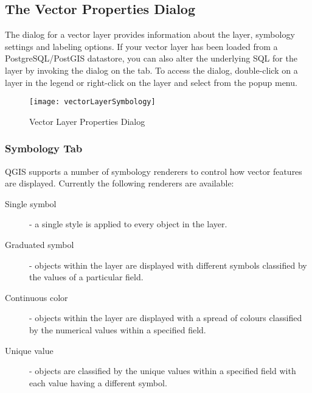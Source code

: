 \subsection{The Vector Properties Dialog}\label{sec:vectorprops}

The  dialog for a vector layer provides information
about the layer, symbology settings and labeling options. If your vector
layer has been loaded from a PostgreSQL/PostGIS datastore, you can also alter
the underlying SQL for the layer by invoking the 
dialog on the  tab. 
To access the  dialog, double-click on a layer in
the legend or right-click on the layer and select 
from the popup menu.

\begin{figure}[H]
   \begin{center}
   \caption{Vector Layer Properties Dialog \nixcaption}\label{fig:vector_symbology}\smallskip
   \texttt{[image: vectorLayerSymbology]} 
\end{center}  
\end{figure}

\subsubsection{Symbology Tab}\label{sec:symbology}

QGIS supports a number of symbology renderers to control how
vector features are displayed. Currently the following renderers
are available:

\begin{description} 
    \item[Single symbol] - a single style is applied to every
    object in the layer.
    \item[Graduated symbol] - objects within the layer are
    displayed with different symbols classified by the values of a
    particular field.
    \item[Continuous color] - objects within the layer are
    displayed with a spread of colours classified by the numerical
    values within a specified field.
    \item[Unique value] - objects are classified by the unique
    values within a specified field with each value having a
    different symbol.
\end{description}

